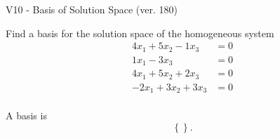 \begin{exercise}
  \begin{exerciseTitle}V10 - Basis of Solution Space (ver. 180)\end{exerciseTitle}
  \begin{exerciseStatement}
    Find a basis for the solution space of the homogeneous system 
\begin{align*}
 4 x_ 1 + 5 x_ 2 -1 x_ 3 &= 0  \\ 
  1 x_ 1 -3 x_ 3 &= 0  \\ 
  4 x_ 1 + 5 x_ 2 + 2 x_ 3 &= 0  \\ 
  -2 x_ 1 + 3 x_ 2 + 3 x_ 3 &= 0  \\ 
 \end{align*}


 
  \end{exerciseStatement}

  \begin{exerciseAnswer}
   A basis is   
\[\left\{\right\}.\]

  


  \end{exerciseAnswer}
\end{exercise}